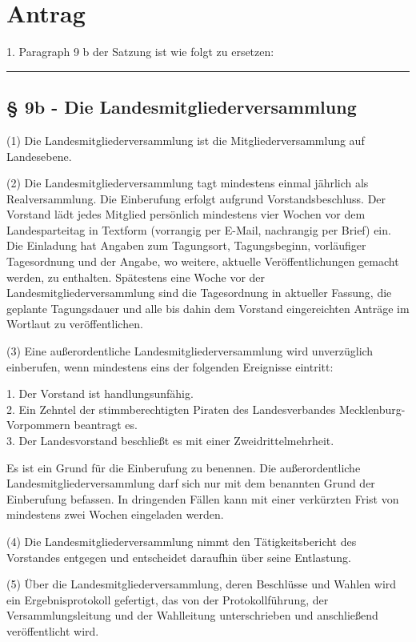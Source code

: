\section{Antrag}

1. Paragraph 9 b der Satzung ist wie folgt zu ersetzen:

\begin{center}\rule{3in}{0.4pt}\end{center}

\subsection{§ 9b - Die Landesmitgliederversammlung}

(1) Die Landesmitgliederversammlung ist die Mitgliederversammlung auf Landesebene.

(2) Die Landesmitgliederversammlung tagt mindestens einmal jährlich als Realversammlung. Die Einberufung erfolgt aufgrund Vorstandsbeschluss. Der Vorstand lädt jedes Mitglied persönlich mindestens vier Wochen vor dem Landesparteitag in Textform (vorrangig per E-Mail, nachrangig per Brief) ein. Die Einladung hat Angaben zum Tagungsort, Tagungsbeginn, vorläufiger Tagesordnung und der Angabe, wo weitere, aktuelle Veröffentlichungen gemacht werden, zu enthalten. Spätestens eine Woche vor der Landesmitgliederversammlung sind die Tagesordnung in aktueller Fassung, die geplante Tagungsdauer und alle bis dahin dem Vorstand eingereichten Anträge im Wortlaut zu veröffentlichen.

(3) Eine außerordentliche Landesmitgliederversammlung wird unverzüglich einberufen, wenn mindestens eins der folgenden Ereignisse eintritt:

1. Der Vorstand ist handlungsunfähig.\\2. Ein Zehntel der stimmberechtigten Piraten des Landesverbandes Mecklenburg-Vorpommern beantragt es.\\3. Der Landesvorstand beschließt es mit einer Zweidrittelmehrheit.

Es ist ein Grund für die Einberufung zu benennen. Die außerordentliche Landesmitgliederversammlung darf sich nur mit dem benannten Grund der Einberufung befassen. In dringenden Fällen kann mit einer verkürzten Frist von mindestens zwei Wochen eingeladen werden.

(4) Die Landesmitgliederversammlung nimmt den Tätigkeitsbericht des Vorstandes entgegen und entscheidet daraufhin über seine Entlastung.

(5) Über die Landesmitgliederversammlung, deren Beschlüsse und Wahlen wird ein Ergebnisprotokoll gefertigt, das von der Protokollführung, der Versammlungsleitung und der Wahlleitung unterschrieben und anschließend veröffentlicht wird.

